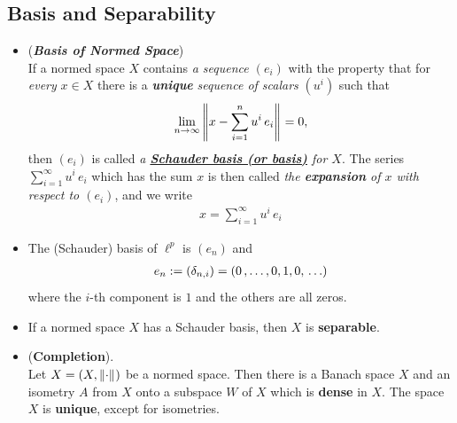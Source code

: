 \documentclass[11pt]{article}
\begin{document}
\subsection{Basis and Separability}
\begin{itemize}
\item \begin{definition} (\emph{\textbf{Basis of Normed Space}})\\
If a normed space $X$ contains \emph{a sequence $(e_i)$} with the property that for \emph{every} $x \in X$ there is a \emph{\textbf{unique}} \emph{sequence of scalars} $(u^i)$ such that
\begin{align}
\lim\limits_{n\rightarrow \infty}\left\|x - \sum_{i=1}^{n}u^i\,e_i\right\|_{} = 0, \label{eqn: normed_space_schauder_basis}
\end{align}
then $(e_i)$ is called \emph{a \underline{\textbf{Schauder basis (or basis)}} for $X$}. The series $\sum_{i=1}^{\infty}u^i\,e_i$ which has the sum $x$ is then called \emph{the \textbf{expansion} of $x$ with respect to $(e_i)$}, and we write
\begin{align*}
x = \sum_{i=1}^{\infty}u^i\,e_i
\end{align*}
\end{definition}

\item \begin{example}
The (Schauder) basis of $\ell^{p}$ is $(e_n)$ and 
\begin{align*}
e_n := (\delta_{n,i}) = (0 \,{,}\ldots{,}\, 0, 1, 0, \,\ldots)
\end{align*}  where the $i$-th component is $1$ and the others are all zeros.
\end{example}

\item \begin{proposition}
If a normed space $X$ has a Schauder basis, then $X$ is \textbf{separable}.
\end{proposition}

\item \begin{theorem} (\textbf{Completion}). \citep{kreyszig1989introductory} \\
Let $X = (X, \left\|\cdot\right\|_{})$ be a normed space. Then there is a Banach space $X$ and an isometry $A$ from $X$ onto a
subspace $W$ of $X$ which is \textbf{dense} in $X$. The space $X$ is \textbf{unique}, except for isometries.
\end{theorem}
\end{itemize}
\end{document}
